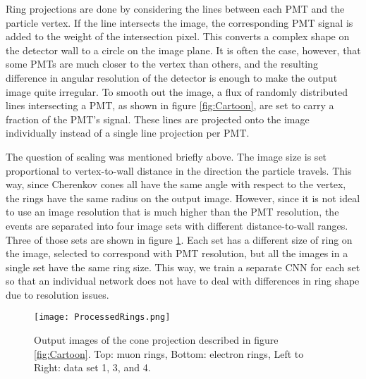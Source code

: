 \documentclass[twoside,twocolumn]{article}
\begin{document}
Ring projections are done by considering the lines between each PMT and the particle vertex. If the line intersects the image, the corresponding PMT signal is added to the weight of the intersection pixel. This converts a complex shape on the detector wall to a circle on the image plane. It is often the case, however, that some PMTs are much closer to the vertex than others, and the resulting difference in angular resolution of the detector is enough to make the output image quite irregular. To smooth out the image, a flux of randomly distributed lines intersecting a PMT, as shown in figure \ref{fig:Cartoon}, are set to carry a fraction of the PMT's signal. These lines are projected onto the image individually instead of a single line projection per PMT.

The question of scaling was mentioned briefly above. The image size is set proportional to vertex-to-wall distance in the direction the particle travels. This way, since Cherenkov cones all have the same angle with respect to the vertex, the rings have the same radius on the output image. However, since it is not ideal to use an image resolution that is much higher than the PMT resolution, the events are separated into four image sets with different distance-to-wall ranges. Three of those sets are shown in figure \ref{fig:ProcessedRings}. Each set has a different size of ring on the image, selected to correspond with PMT resolution, but all the images in a single set have the same ring size. This way, we train a separate CNN for each set so that an individual network does not have to deal with differences in ring shape due to resolution issues.

\begin{figure}[ht]
    \centering
    \texttt{[image: ProcessedRings.png]}
    \caption{Output images of the cone projection described in figure \ref{fig:Cartoon}. Top: muon rings, Bottom: electron rings, Left to Right: data set 1, 3, and 4.}
    \label{fig:ProcessedRings}
\end{figure}
\end{document}
